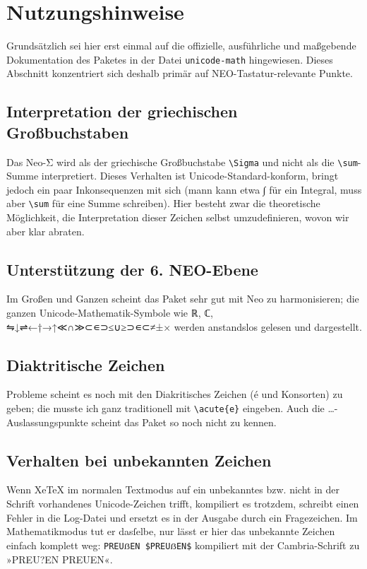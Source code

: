 ﻿\documentclass{scrartcl}
\begin{document}
\section{Nutzungshinweise}
Grundsätzlich sei hier erst einmal auf die offizielle, ausführliche und maßgebende Dokumentation des Paketes in der Datei \verb|unicode-math| hingewiesen. Dieses Abschnitt konzentriert sich deshalb primär auf NEO-Tastatur-relevante Punkte.

\subsection{Interpretation der griechischen Großbuchstaben}
Das Neo-Σ wird als der griechische Großbuchstabe \verb|\Sigma| und nicht als die \verb|\sum|-Summe interpretiert. Dieses Verhalten ist Unicode-Standard-konform, bringt jedoch ein paar Inkonsequenzen mit sich (mann kann etwa ∫ für ein Integral, muss aber \verb|\sum| für eine Summe schreiben). Hier besteht zwar die theoretische Möglichkeit, die Interpretation dieser Zeichen selbst umzudefinieren, wovon wir aber klar abraten.

\subsection{Unterstützung der 6. NEO-Ebene}
Im Großen und Ganzen scheint das Paket sehr gut mit Neo zu harmonisieren; die ganzen Unicode-Mathematik-Symbole wie ℝ, ℂ, ⇋↓⇌←†→↑≪∩≫⊂∊⊃≤∪≥⊃∊⊂≠±× werden anstandslos gelesen und dargestellt.

\subsection{Diaktritische Zeichen}
Probleme scheint es noch mit den Diakritisches Zeichen (é und Konsorten) zu geben; die musste ich ganz traditionell mit \verb|\acute{e}| eingeben. Auch die …-Auslassungspunkte scheint das Paket so noch nicht zu kennen.

\subsection{Verhalten bei unbekannten Zeichen}
Wenn XeTeX im normalen Textmodus auf ein unbekanntes bzw. nicht in der Schrift vorhandenes Unicode-Zeichen trifft, kompiliert es trotzdem, schreibt einen Fehler in die Log-Datei und ersetzt es in der Ausgabe durch ein Fragezeichen. Im Mathematikmodus tut er dasſelbe, nur lässt er hier das unbekannte Zeichen einfach komplett weg: \verb|PREUẞEN $PREUẞEN$| kompiliert mit der Cambria-Schrift zu »PREU?EN PREUEN«.
\end{document}
